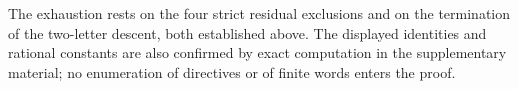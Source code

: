 The exhaustion rests on the four strict residual exclusions and on the
termination of the two-letter descent, both established above. The
displayed identities and rational constants are also confirmed by exact
computation in the supplementary material; no enumeration of directives
or of finite words enters the proof.
